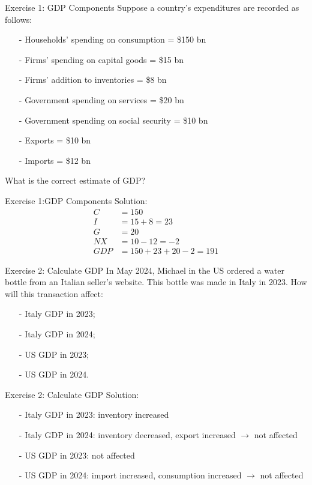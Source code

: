 \documentclass[9pt]{beamer}
\begin{document}
\begin{frame}{Exercise 1: GDP Components}
    Suppose a country's expenditures are recorded as follows: 
    \begin{itemize}
        \item[-] Households’ spending on consumption = \$150 bn
        \item[-] Firms’ spending on capital goods = \$15 bn
        \item[-] Firms’ addition to inventories = \$8 bn
        \item[-] Government spending on services = \$20 bn
        \item[-] Government spending on social security = \$10 bn
        \item[-] Exports = \$10 bn
        \item[-] Imports = \$12 bn
    \end{itemize}
    What is the correct estimate of GDP?
    \vspace{1in}
\end{frame}

\begin{frame}{Exercise 1:GDP Components}
    Solution: 
    \begin{align*}
        C&=150\\
        I&=15+8=23\\
        G&=20\\
        NX&=10-12=-2\\
        GDP&=150+23+20-2=191
    \end{align*}
\end{frame}

\begin{frame}{Exercise 2: Calculate GDP}
    In May 2024, Michael in the US ordered a water bottle from an Italian seller's website. This bottle was made in Italy in 2023. How will this transaction affect: 
    \begin{itemize}
        \item[-] Italy GDP in 2023;
        \item[-] Italy GDP in 2024;
        \item[-] US GDP in 2023;
        \item[-] US GDP in 2024.
    \end{itemize}
    \vspace{1in}
\end{frame}

\begin{frame}{Exercise 2: Calculate GDP}
    Solution: 
    \begin{itemize}
        \item[-] Italy GDP in 2023: inventory increased 
        \item[-] Italy GDP in 2024: inventory decreased, export increased $\rightarrow$ not affected 
        \item[-] US GDP in 2023: not affected 
        \item[-] US GDP in 2024: import increased, consumption increased $\rightarrow$ not affected 
    \end{itemize}
\end{frame}
\end{document}

